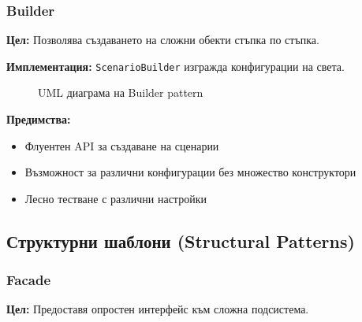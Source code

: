 \documentclass{article}
\begin{document}
	\subsubsection{Builder}
	
	\textbf{Цел:} Позволява създаването на сложни обекти стъпка по стъпка.
	
	\textbf{Имплементация:} \texttt{ScenarioBuilder} изгражда конфигурации на света.
	
	\begin{figure}[H]
		\centering
		\caption{UML диаграма на Builder pattern}
	\end{figure}

\textbf{Предимства:}
\begin{itemize}
	\item Флуентен API за създаване на сценарии
	\item Възможност за различни конфигурации без множество конструктори
	\item Лесно тестване с различни настройки
\end{itemize}

\subsection{Структурни шаблони (Structural Patterns)}

\subsubsection{Facade}

\textbf{Цел:} Предоставя опростен интерфейс към сложна подсистема.
\end{document}
